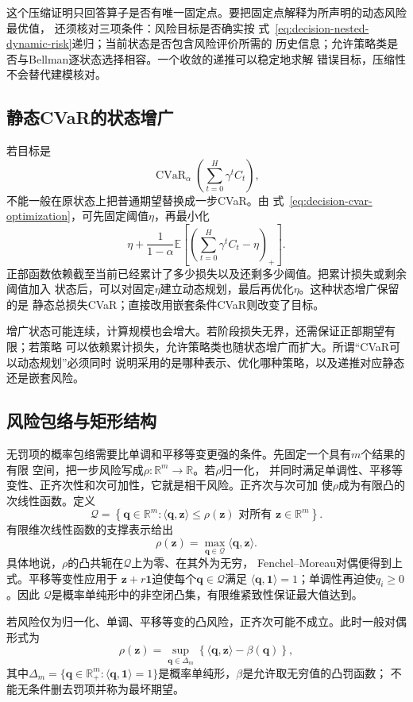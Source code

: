 这个压缩证明只回答算子是否有唯一固定点。要把固定点解释为所声明的动态风险最优值，
还须核对三项条件：风险目标是否确实按
式~\eqref{eq:decision-nested-dynamic-risk}递归；当前状态是否包含风险评价所需的
历史信息；允许策略类是否与Bellman逐状态选择相容。一个收敛的递推可以稳定地求解
错误目标，压缩性不会替代建模核对。

\subsection{静态CVaR的状态增广}
若目标是
\[
  \operatorname{CVaR}_{\alpha}
  \left(
    \sum_{t=0}^{H}\gamma^t C_t
  \right),
\]
不能一般在原状态上把普通期望替换成一步CVaR。由
式~\eqref{eq:decision-cvar-optimization}，可先固定阈值\(\eta\)，再最小化
\[
  \eta+
  \frac{1}{1-\alpha}
  \mathbb{E}
  \left[
    \left(
      \sum_{t=0}^{H}\gamma^tC_t-\eta
    \right)_+
  \right].
\]
正部函数依赖截至当前已经累计了多少损失以及还剩多少阈值。把累计损失或剩余阈值加入
状态后，可以对固定\(\eta\)建立动态规划，最后再优化\(\eta\)。这种状态增广保留的是
静态总损失CVaR；直接改用嵌套条件CVaR则改变了目标。

增广状态可能连续，计算规模也会增大。若阶段损失无界，还需保证正部期望有限；若策略
可以依赖累计损失，允许策略类也随状态增广而扩大。所谓“CVaR可以动态规划”必须同时
说明采用的是哪种表示、优化哪种策略，以及递推对应静态还是嵌套风险。

\subsection{风险包络与矩形结构}
无罚项的概率包络需要比单调和平移等变更强的条件。先固定一个具有\(m\)个结果的有限
空间，把一步风险写成\(\rho:\mathbb{R}^m\to\mathbb{R}\)。若\(\rho\)归一化，
并同时满足单调性、平移等变性、正齐次性和次可加性，它就是相干风险。正齐次与次可加
使\(\rho\)成为有限凸的次线性函数。定义
\[
  \mathcal{Q}
  =
  \left\{
    \bm q\in\mathbb{R}^m:
    \langle\bm q,\bm z\rangle\leq\rho(\bm z)
    \text{ 对所有 }\bm z\in\mathbb{R}^m
  \right\}.
\]
有限维次线性函数的支撑表示给出
\[
  \rho(\bm z)
  =
  \max_{\bm q\in\mathcal{Q}}
  \langle\bm q,\bm z\rangle.
\]
具体地说，\(\rho\)的凸共轭在\(\mathcal{Q}\)上为零、在其外为无穷，
Fenchel--Moreau对偶便得到上式。平移等变性应用于
\(\bm z+r\bm 1\)迫使每个\(\bm q\in\mathcal{Q}\)满足
\(\langle\bm q,\bm 1\rangle=1\)；单调性再迫使\(q_i\geq0\)。因此
\(\mathcal{Q}\)是概率单纯形中的非空闭凸集，有限维紧致性保证最大值达到。

若风险仅为归一化、单调、平移等变的凸风险，正齐次可能不成立。此时一般对偶形式为
\[
  \rho(\bm z)
  =
  \sup_{\bm q\in\Delta_m}
  \left\{
    \langle\bm q,\bm z\rangle-\beta(\bm q)
  \right\},
\]
其中\(\Delta_m=\{\bm q\in\mathbb{R}_+^m:
\langle\bm q,\bm 1\rangle=1\}\)是概率单纯形，\(\beta\)是允许取无穷值的凸罚函数；
不能无条件删去罚项并称为最坏期望。

